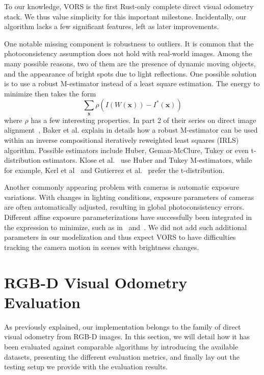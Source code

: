 To our knowledge,
VORS is the first Rust-only complete direct visual odometry stack.
We thus value simplicity for this important milestone.
Incidentally, our algorithm lacks a few significant features,
left as later improvements.

One notable missing component is robustness to outliers.
It is common that the photoconsistency assumption does not hold with real-world images.
Among the many possible reasons, two of them are the presence of dynamic moving objects,
and the appearance of bright spots due to light reflections.
One possible solution is to use a robust M-estimator instead of a least square estimation.
The energy to minimize then takes the form
\[
	\sum_{\bm{x}}\rho(I(W(\bm{x})) - I^{*}(\bm{x}))
\]
where $\rho$ has a few interesting properties.
In part 2 of their series on direct image alignment~\cite{baker2003lucas},
Baker et al. explain in details how a robust M-estimator can be used
within an inverse compositional iteratively reweighted least squares (IRLS) algorithm.
Possible estimators include Huber, Geman-McClure, Tukey or even t-distribution estimators.
Klose et al.~\cite{klose2013efficient} use Huber and Tukey M-estimators,
while for example, Kerl et al~\cite{kerl2013robust}
and Gutierrez et al.~\cite{gutierrez2015inverse} prefer the t-distribution.

Another commonly appearing problem with cameras is automatic exposure variations.
With changes in lighting conditions,
exposure parameters of cameras are often automatically adjusted,
resulting in global photoconsistency errors.
Different affine exposure parameterizations have successfully been integrated
in the expression to minimize, such as in~\cite{klose2013efficient} and~\cite{engel2017direct}.
We did not add such additional parameters in our modelization
and thus expect VORS to have difficulties tracking the camera motion
in scenes with brightness changes.


\section{RGB-D Visual Odometry Evaluation}%
\label{sec:rgbd-vo-evaluation}

As previously explained, our implementation
belongs to the family of direct visual odometry from RGB-D images.
In this section, we will detail how it has been evaluated against
comparable algorithms by introducing the available datasets,
presenting the different evaluation metrics,
and finally lay out the testing setup we provide with the evaluation results.

